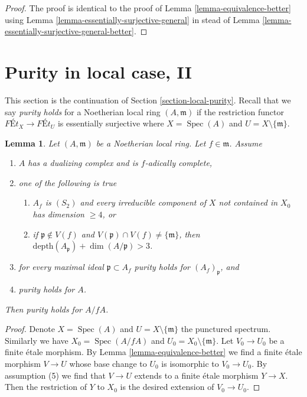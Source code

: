 \documentclass{stacks-project}
\theoremstyle{plain}
\newtheorem{lemma}[subsection]{Lemma}
\theoremstyle{definition}
\theoremstyle{remark}
\numberwithin{equation}{subsection}
\def\Spec{\mathop{\mathrm{Spec}}}
\begin{document}
\begin{proof}
The proof is identical to the proof of
Lemma \ref{lemma-equivalence-better}
using
Lemma \ref{lemma-essentially-surjective-general}
in stead of
Lemma \ref{lemma-essentially-surjective-general-better}.
\end{proof}



\section{Purity in local case, II}
\label{section-local-purity-II}

\noindent
This section is the continuation of Section \ref{section-local-purity}.
Recall that we say {\it purity holds} for a Noetherian local ring
$(A, \mathfrak m)$ if the restriction functor
$\textit{F\'Et}_X \to \textit{F\'Et}_U$ is essentially
surjective where $X = \Spec(A)$ and $U = X \setminus \{\mathfrak m\}$.

\begin{lemma}
\label{lemma-purity-inherited-by-hypersurface-better}
Let $(A, \mathfrak m)$ be a Noetherian local ring.
Let $f \in \mathfrak m$. Assume
\begin{enumerate}
\item $A$ has a dualizing complex and is $f$-adically complete,
\item one of the following is true
\begin{enumerate}
\item $A_f$ is $(S_2)$ and every irreducible component of $X$
not contained in $X_0$ has dimension $\geq 4$, or
\item if $\mathfrak p \not \in V(f)$ and
$V(\mathfrak p) \cap V(f) \not = \{\mathfrak m\}$, then
$\text{depth}(A_\mathfrak p) + \dim(A/\mathfrak p) > 3$.
\end{enumerate}
\item for every maximal ideal $\mathfrak p \subset A_f$
purity holds for $(A_f)_\mathfrak p$, and
\item purity holds for $A$.
\end{enumerate}
Then purity holds for $A/fA$.
\end{lemma}

\begin{proof}
Denote $X = \Spec(A)$ and $U = X \setminus \{\mathfrak m\}$
the punctured spectrum. Similarly we have $X_0 = \Spec(A/fA)$
and $U_0 = X_0 \setminus \{\mathfrak m\}$.
Let $V_0 \to U_0$ be a finite \'etale morphism. By
Lemma \ref{lemma-equivalence-better}
we find a finite \'etale morphism $V \to U$
whose base change to $U_0$
is isomorphic to $V_0 \to U_0$.
By assumption (5) we find that $V \to U$ extends
to a finite \'etale morphism $Y \to X$. Then the restriction of
$Y$ to $X_0$ is the desired extension of $V_0 \to U_0$.
\end{proof}
\end{document}

